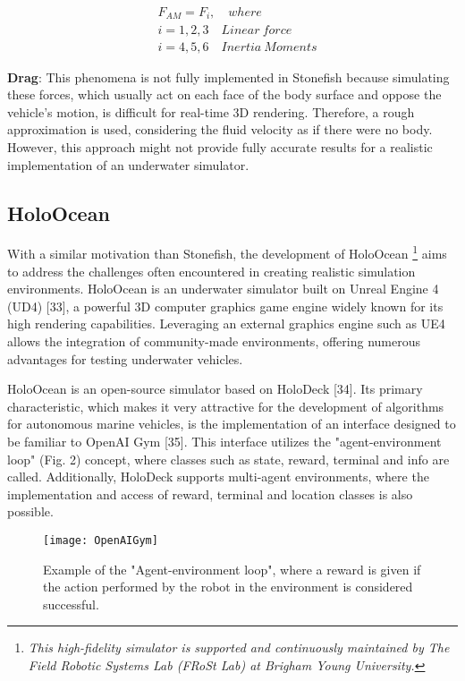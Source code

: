 \documentclass[]{article}
\begin{document}
		\begin{equation}
			\begin{aligned}
			& F_{AM} = F_{i}, \quad where\\
			& i ={1,2,3} \quad Linear \ force \\
			& i ={4,5,6} \quad Inertia \ Moments
			\end{aligned}
		\end{equation}
		
		
		\textbf{Drag}: This phenomena is not fully implemented in Stonefish because simulating these forces, which usually act on each face of the body surface and oppose the vehicle's motion, is difficult for real-time 3D rendering. Therefore, a rough approximation is used, considering the fluid velocity as if there were no body. However, this approach might not provide fully accurate results for a realistic implementation of an underwater simulator.
		
		
	\subsection{HoloOcean}
	
	With a similar motivation than Stonefish, the development of HoloOcean \footnote[8]{\textit{This high-fidelity simulator is supported and continuously maintained by The Field Robotic Systems Lab (FRoSt Lab) at Brigham Young University.}} aims to address the challenges often encountered in creating realistic simulation environments. HoloOcean is an underwater simulator built on Unreal Engine 4 (UD4) [33], a powerful 3D computer graphics game engine widely known for its high rendering capabilities. Leveraging an external graphics engine such as UE4 allows the integration of community-made environments, offering numerous advantages for testing underwater vehicles. 
	
	
	HoloOcean is an open-source simulator based on HoloDeck [34]. Its primary characteristic, which makes it very attractive for the development of algorithms for autonomous marine vehicles, is the implementation of an interface designed to be familiar to OpenAI Gym [35]. This interface utilizes the "agent-environment loop" (Fig. 2) concept, where classes such as state, reward, terminal and info are called. Additionally, HoloDeck supports multi-agent environments, where the implementation and access of reward, terminal and location classes is also possible.
	
	\begin{figure}[h]
		\centering
		\texttt{[image: OpenAIGym]}
		\caption{Example of the "Agent-environment loop", where a reward is given if the action performed by the robot in the environment is considered successful.}
	\end{figure}
	
\end{document}
